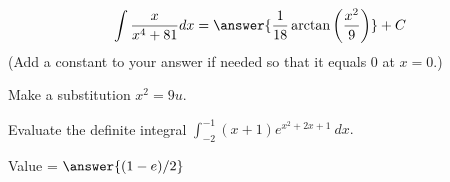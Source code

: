 \documentclass{ximera}
\begin{document}
\begin{exercise}%
\[ \int \frac{x}{x^4+81} dx = \answer{\frac{1}{18} \arctan \left(\frac{x^2}{9}\right)}+C \]
(Add a constant to your answer if needed so that it equals $0$ at $x = 0$.)
\begin{hint}
Make a substitution $x^2 = 9 u$.
\end{hint}
%
%
\end{exercise}

\begin{exercise}%
Evaluate the definite integral \(\displaystyle \int_{-2}^{-1} (x+1)e^{x^2+2x+1}\ dx. \)
\begin{center}
\begin{prompt}
Value = \(\answer{(1-e)/2}\)
\end{prompt}
\end{center}
%
%
\end{exercise}
\end{document}
